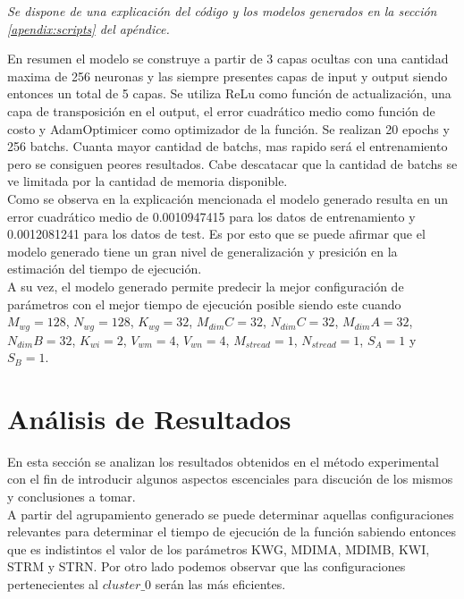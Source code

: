 \documentclass[osajnl,twocolumn,showpacs,superscriptaddress,10pt]{revtex4-1} %
\begin{document}
\begin{flushright}
\textit{\footnotesize Se dispone de una explicación del código y los modelos generados en la sección \ref{apendix:scripts} del apéndice.}
\end{flushright}

En resumen el modelo se construye a partir de 3 capas ocultas con una cantidad maxima de 256 neuronas y las siempre presentes capas de input y output siendo entonces un total de 5 capas. Se utiliza ReLu como función de actualización, una capa de transposición en el output, el error cuadrático medio como función de costo y AdamOptimicer como optimizador de la función. Se realizan 20 epochs y 256 batchs. Cuanta mayor cantidad de batchs, mas rapido será el entrenamiento pero se consiguen peores resultados. Cabe descatacar que la cantidad de batchs se ve limitada por la cantidad de memoria disponible. \\

Como se observa en la explicación mencionada el modelo generado resulta en un error cuadrático medio de 0.0010947415 para los datos de entrenamiento y 0.0012081241 para los datos de test. Es por esto que se puede afirmar que el modelo generado tiene un gran nivel de generalización y presición en la estimación del tiempo de ejecución. \\

A su vez, el modelo generado permite predecir la mejor configuración de parámetros con el mejor tiempo de ejecución posible siendo este cuando $M_{wg} = 128$, $N_{wg} = 128$,  $K_{wg} = 32$,  $M_{dim}C = 32$, $N_{dim}C = 32$, $M_{dim}A = 32$, $ N_{dim}B = 32$, $K_{wi} = 2$, $V_{wm} = 4$, $V_{wn} = 4$, $M_{stread} = 1$, $N_{stread} = 1$, $S_A = 1$ y $S_B = 1$. \\

\section{Análisis de Resultados} \label{section:results_analysis}

En esta sección se analizan los resultados obtenidos en el método experimental con el fin de introducir algunos aspectos escenciales para discución de los mismos y conclusiones a tomar. \\

A partir del agrupamiento generado se puede determinar aquellas configuraciones relevantes para determinar el tiempo de ejecución de la función sabiendo entonces que es indistintos el valor de los parámetros KWG, MDIMA, MDIMB, KWI, STRM y STRN. Por otro lado podemos observar que las configuraciones pertenecientes al $cluster\_0$ serán las más eficientes. \\
\end{document}
